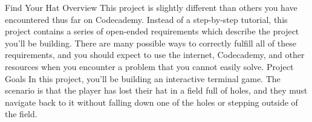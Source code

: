 Find Your Hat
Overview
    This project is slightly different than others you have encountered thus far on Codecademy. Instead of a step-by-step tutorial, this project contains a series of open-ended requirements which describe the project you’ll be building. There are many possible ways to correctly fulfill all of these requirements, and you should expect to use the internet, Codecademy, and other resources when you encounter a problem that you cannot easily solve.
Project Goals
    In this project, you’ll be building an interactive terminal game. The scenario is that the player has lost their hat in a field full of holes, and they must navigate back to it without falling down one of the holes or stepping outside of the field.